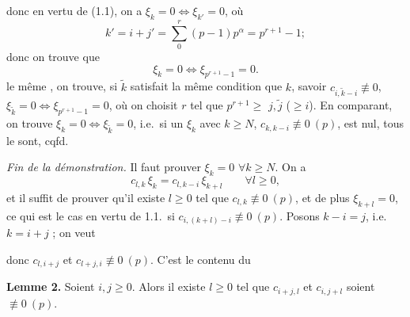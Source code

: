 \documentclass[11pt,a4paper]{article}
\begin{document}

donc en vertu de (1.1), on a $\xi_k = 0 \iff \xi_{k'} = 0$, où
\[
  k' = i + j' = \sum_0^r (p-1) p^\alpha = p^{r+1} - 1 ;
\]
donc on trouve que
\[
  \xi_k = 0 \iff \xi_{p^{r+1} - 1} = 0 .
\]
 le même , on trouve, si $\tilde k$ satisfait la même
condition que $k$, savoir $c_{i, \tilde k - i} \not\equiv 0$,
$\xi_{\tilde k} = 0 \iff \xi_{p^{r+1}-1} = 0$, où on choisit $r$ tel que
$p^{r+1} \geq$ \struck{\ill{}} $j, \tilde j$ ($\geq i$). En comparant, on trouve
$\xi_k = 0 \iff \xi_{\tilde k} = 0$, i.e.\ si un $\xi_k$ avec $k \geq N$,
$c_{k, k-i} \not\equiv 0 \ (p)$, est nul, tous le sont, cqfd.

\emph{Fin de la démonstration.} Il  faut prouver $\xi_k = 0$
$\forall k \geq N$. On a
\[
  c_{l,k}\, \xi_k = c_{l, k-i}\, \xi_{k+l} \qquad \forall l \geq 0 ,
\]
et il suffit de prouver qu'il existe $l \geq 0$ tel que $c_{l,k} \not\equiv 0 \ (p)$, et de plus
$\xi_{k+l} = 0$, ce qui est le cas  en vertu de 1.1.\ si
$c_{i, (k+l) - i} \not\equiv 0 \ (p)$. Posons $k - i = j$, i.e.\ $k = i + j$ ; on veut

donc $c_{l, i+j}$ et $c_{l+j, i} \not\equiv 0 \ (p)$. C'est le contenu du

\textbf{Lemme 2.} Soient $i, j \geq 0$. Alors il existe $l \geq 0$ tel que \struck{\ill{}}
$c_{i+j, l}$ et $c_{i, j+l}$ soient $\not\equiv 0 \ (p)$.
\end{document}
